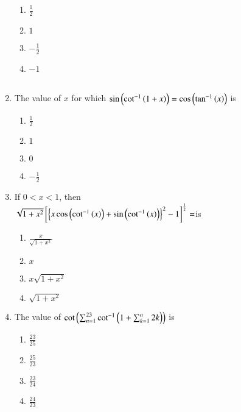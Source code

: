 \documentclass[journal,12pt,twocolumn,article]{IEEEtran}
\theoremstyle{remark}
\begin{document}
\begin{enumerate}
\hfill {}
\begin{multicols}{2}
\begin{enumerate}
\item $\frac{1}{2}$
\item $1$ 
\columnbreak
\item $-\frac{1}{2}$ 
\item $-1$\\\\
\end{enumerate}
\end{multicols}
\item The value of $x$ for which $\sin\left(\cot^{-1}\left(1+x\right)\right)=\cos \left(\tan ^{-1}\left(x\right)\right)$ is 
\hfill {}
\begin{multicols}{2}
\begin{enumerate}
\item $\frac{1}{2}$ 
\item $1$
\columnbreak
\item $0$ 
\item $-\frac{1}{2}$
\end{enumerate}
\end{multicols}
\item  If $0<x<1$, then \\
	$\sqrt{1+x^2}{}\left[\left\{ x\cos \left(\cot ^{-1}\left(x\right)\right)+ \sin \left(\cot ^{-1}\left(x\right)\right)\right\}^2 -1\right]^{\frac{1}{2}}=$is
\hfill {}
\begin{multicols}{2}
\begin{enumerate}
\item $\frac{x}{\sqrt{1+x^2}}$ 
\item $x$
\columnbreak
\item $x\sqrt{1+x^2}$ 
\item $\sqrt{1+x^2}$
\end{enumerate}
\end{multicols}
\item The value of $\cot \left(\sum_{n=1}^{23} \cot ^{-1}\left(1+\sum_{k=1}^{n} 2k\right)\right)$ is
\hfill {}
\begin{multicols}{2}
\begin{enumerate}
\item $\frac{23}{25}$ 
\item $\frac{25}{23}$ 
\columnbreak
\item $\frac{23}{24}$ 
\item $\frac{24}{23}$
\end{enumerate}
\end{multicols}
\end{enumerate}
\end{document}
